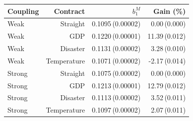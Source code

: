 \begin{tabular}{@{}lrrr@{}}
\toprule
Coupling & Contract & $b_1^M$ & Gain (\%) \\ \midrule
Weak & Straight & 0.1095\,(0.00002) & 0.00\,(0.000) \\
Weak & GDP & 0.1220\,(0.00001) & 11.39\,(0.012) \\
Weak & Disaster & 0.1131\,(0.00002) & 3.28\,(0.010) \\
Weak & Temperature & 0.1071\,(0.00002) & -2.17\,(0.014) \\
Strong & Straight & 0.1075\,(0.00002) & 0.00\,(0.000) \\
Strong & GDP & 0.1213\,(0.00001) & 12.79\,(0.012) \\
Strong & Disaster & 0.1113\,(0.00002) & 3.52\,(0.011) \\
Strong & Temperature & 0.1097\,(0.00002) & 2.07\,(0.011) \\
\bottomrule
\end{tabular}
